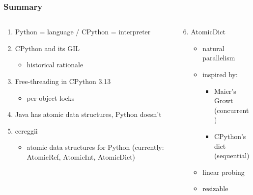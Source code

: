 \documentclass[aspectratio=169]{beamer}
\begin{document}
\begin{frame}
    \frametitle{Summary}

    \begin{columns}
        \begin{column}{0.5\textwidth}
            \begin{enumerate}
                \item Python = language / CPython = interpreter
                \item CPython and its GIL
                \begin{itemize}
                    \item historical rationale
                \end{itemize}
                \item Free-threading in CPython 3.13
                \begin{itemize}
                    \item per-object locks
                \end{itemize}
                \item Java has atomic data structures, Python doesn't
                \item cereggii
                \begin{itemize}
                    \item atomic data structures for Python (currently: AtomicRef, AtomicInt, AtomicDict)
                \end{itemize}
            \end{enumerate}
        \end{column}
        \begin{column}{0.5\textwidth}
            \begin{enumerate}
                \setcounter{enumi}{5}
                \item AtomicDict
                \begin{itemize}
                    \item natural parallelism
                    \item inspired by:
                    \begin{itemize}
                        \item Maier's Growt (concurrent)
                        \item CPython's dict (sequential)
                    \end{itemize}
                    \item linear probing
                    \item resizable

\end{itemize}
\end{enumerate}
\end{column}
\end{columns}
\end{frame}
\end{document}
